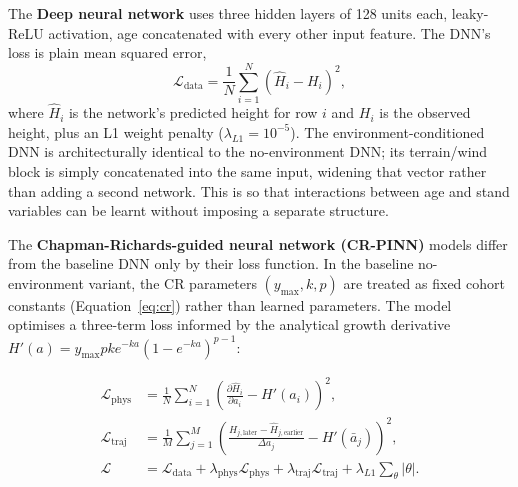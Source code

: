 The \textbf{Deep neural network} uses three hidden layers of 128 units each, leaky-ReLU activation, age concatenated with every other
input feature. The DNN's loss is plain mean squared error,
\begin{equation}
\mathcal{L}_{\text{data}} = \frac{1}{N}\sum_{i=1}^{N}\left(\hat H_i - H_i\right)^2,
\label{eq:data-loss}
\end{equation}
where $\hat H_i$ is the network's predicted height for row $i$ and $H_i$ is the observed height,
plus an L1 weight penalty ($\lambda_{L1}=10^{-5}$). The environment-conditioned DNN is
architecturally identical to the no-environment DNN; its terrain/wind block is simply concatenated
into the same input, widening that vector rather than adding a second network. This is so that interactions between age and stand variables can be learnt without imposing a separate structure.

The \textbf{Chapman-Richards-guided neural network (CR-PINN)} models differ from the baseline DNN only by their loss function. In the baseline no-environment variant, the CR parameters $(y_{\max}, k, p)$ are treated as fixed cohort constants (Equation~\ref{eq:cr}) rather than learned parameters. The model optimises a three-term loss informed by the analytical growth derivative $H'(a) = y_{\max} p k e^{-ka}(1 - e^{-ka})^{p-1}$:

\begin{subequations}
\label{eq:cr-pinn-losses}
\begin{align}
\mathcal{L}_{\text{phys}} &= \frac{1}{N}\sum_{i=1}^{N}\left(\frac{\partial \hat{H}_i}{\partial a_i} - H'(a_i)\right)^2, \label{eq:physics-loss} \\
\mathcal{L}_{\text{traj}} &= \frac{1}{M}\sum_{j=1}^{M}\left(\frac{\hat{H}_{j,\text{later}} - \hat{H}_{j,\text{earlier}}}{\Delta a_j} - H'(\bar{a}_j)\right)^2, \label{eq:trajectory-loss} \\
\mathcal{L} &= \mathcal{L}_{\text{data}} + \lambda_{\text{phys}}\mathcal{L}_{\text{phys}} + \lambda_{\text{traj}}\mathcal{L}_{\text{traj}} + \lambda_{L1}\sum_{\theta}|\theta|. \label{eq:total-loss}
\end{align}
\end{subequations}

